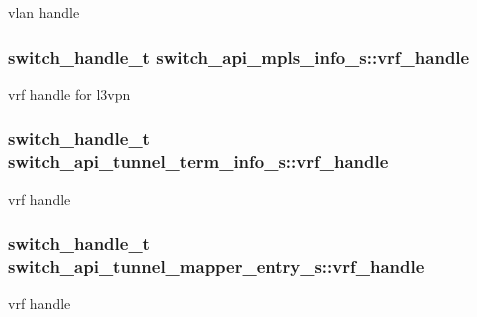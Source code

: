 vlan handle \hypertarget{group__Tunnel_ga93781a9c1fb024b92c97056e2c95cc9d}{
\subsubsection[{vrf\+\_\+handle}]{\setlength{\rightskip}{0pt plus 5cm}switch\+\_\+handle\+\_\+t switch\+\_\+api\+\_\+mpls\+\_\+info\+\_\+s\+::vrf\+\_\+handle}}\label{group__Tunnel_ga93781a9c1fb024b92c97056e2c95cc9d}
vrf handle for l3vpn \hypertarget{group__Tunnel_gad17881c029ef16dde1b3fdc6d66ad388}{
\subsubsection[{vrf\+\_\+handle}]{\setlength{\rightskip}{0pt plus 5cm}switch\+\_\+handle\+\_\+t switch\+\_\+api\+\_\+tunnel\+\_\+term\+\_\+info\+\_\+s\+::vrf\+\_\+handle}}\label{group__Tunnel_gad17881c029ef16dde1b3fdc6d66ad388}
vrf handle \hypertarget{group__Tunnel_ga394a19941f2d37aa9e323044f18e349b}{
\subsubsection[{vrf\+\_\+handle}]{\setlength{\rightskip}{0pt plus 5cm}switch\+\_\+handle\+\_\+t switch\+\_\+api\+\_\+tunnel\+\_\+mapper\+\_\+entry\+\_\+s\+::vrf\+\_\+handle}}\label{group__Tunnel_ga394a19941f2d37aa9e323044f18e349b}
vrf handle 